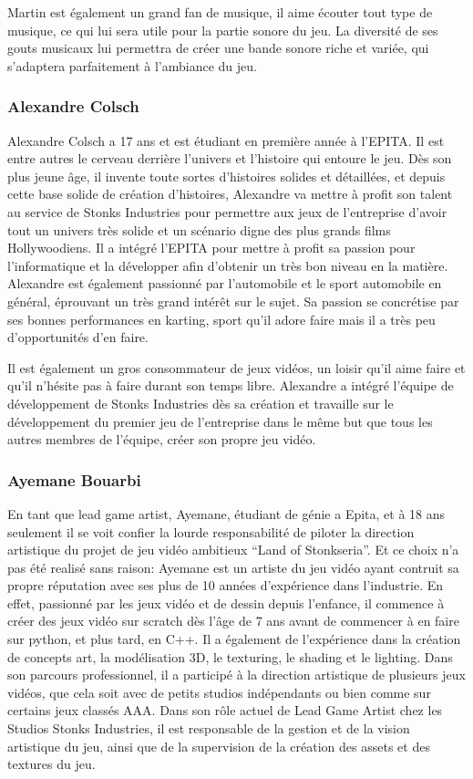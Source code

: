 Martin est également un grand fan de musique, il aime écouter tout type de musique, ce qui lui sera utile pour la partie sonore du jeu.
La diversité de ses gouts musicaux lui permettra de créer une bande sonore riche et variée, qui s'adaptera parfaitement à l'ambiance du jeu.

\subsubsection*{Alexandre Colsch}

Alexandre Colsch a 17 ans et est étudiant en première année à l’EPITA.
Il est entre autres le cerveau derrière l’univers et l’histoire qui entoure le jeu.
Dès son plus jeune âge, il invente toute sortes d’histoires solides et détaillées, et depuis cette base solide de création d’histoires, Alexandre va mettre à profit son talent au service de Stonks Industries pour permettre aux jeux de l’entreprise d’avoir tout un univers très solide et un scénario digne des plus grands films Hollywoodiens.
Il a intégré l’EPITA pour mettre à profit sa passion pour l’informatique et la développer afin d’obtenir un très bon niveau en la matière.
Alexandre est également passionné par l’automobile et le sport automobile en général, éprouvant un très grand intérêt sur le sujet.
Sa passion se concrétise par ses bonnes performances en karting, sport qu’il adore faire mais il a très peu d'opportunités d’en faire.

Il est également un gros consommateur de jeux vidéos, un loisir qu’il aime faire et qu’il n'hésite pas à faire durant son temps libre.
Alexandre a intégré l'équipe de développement de Stonks Industries dès sa création et travaille sur le développement du premier jeu de l’entreprise dans le même but que tous les autres membres de l'équipe, créer son propre jeu vidéo.


\subsubsection*{Ayemane Bouarbi}

En tant que lead game artist, Ayemane, étudiant de génie a Epita, et à 18 ans seulement il se voit confier la lourde responsabilité de piloter la direction artistique du projet de jeu vidéo ambitieux “Land of Stonkseria”. 
Et ce choix n’a pas été realisé sans raison: Ayemane est un artiste du jeu vidéo ayant contruit sa propre réputation avec ses plus de 10 années d'expérience dans l’industrie. 
En effet, passionné par les jeux vidéo et de dessin depuis l’enfance, il commence à créer des jeux vidéo sur scratch dès l'âge de 7 ans avant de commencer à en faire sur python, et plus tard, en C++. 
Il a également de l’expérience dans la création de concepts art, la modélisation 3D, le texturing, le shading et le lighting.
Dans son parcours professionnel, il a participé à la direction artistique de plusieurs jeux vidéos, que cela soit avec de petits studios indépendants ou bien comme sur certains jeux classés AAA.
Dans son rôle actuel de Lead Game Artist chez les Studios Stonks Industries, il est responsable de la gestion et de la vision artistique du jeu, ainsi que de la  supervision de la création des assets et des textures du jeu.

